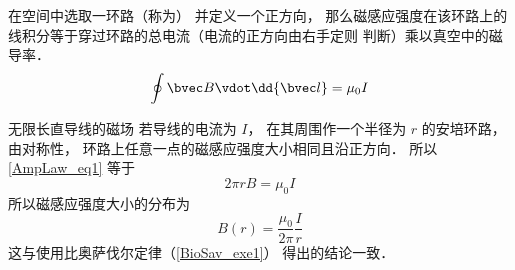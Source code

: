 
在空间中选取一环路（称为） 并定义一个正方向， 那么磁感应强度在该环路上的线积分等于穿过环路的总电流（电流的正方向由右手定则 判断）乘以真空中的磁导率．
\begin{equation}\label{AmpLaw_eq1}
\oint \bvec B \vdot \dd{\bvec l} = \mu_0 I
\end{equation}

\begin{example}{无限长直导线的磁场}
若导线的电流为 $I$， 在其周围作一个半径为 $r$ 的安培环路， 由对称性， 环路上任意一点的磁感应强度大小相同且沿正方向． 所以\autoref{AmpLaw_eq1} 等于
\begin{equation}
2\pi r B = \mu_0 I
\end{equation}
所以磁感应强度大小的分布为
\begin{equation}
B(r) = \frac{\mu_0}{2\pi} \frac Ir
\end{equation}
这与使用比奥萨伐尔定律（\autoref{BioSav_exe1}） 得出的结论一致．
\end{example}
